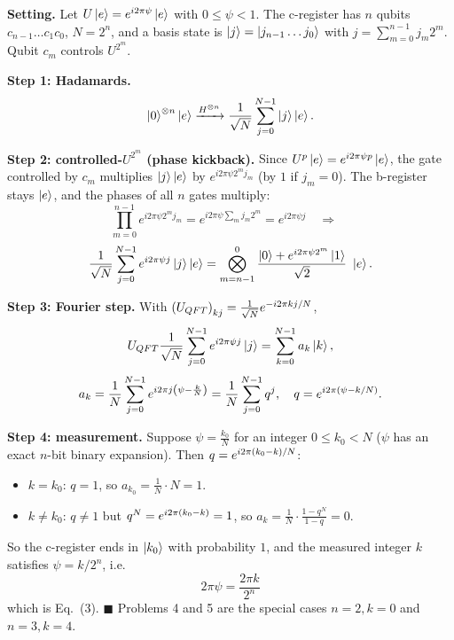 \documentclass[a4paper, 10pt]{article}
\begin{document}
\begin{solution}
	\noindent \textbf{Setting.} Let \( U\ket{e} = e^{i2\pi\psi}\ket{e} \) with \( 0 \le \psi < 1 \). The c-register has \( n \) qubits \( c_{n - 1}\dots c_1c_0 \), \( N = 2^n \), and a basis state is \( \ket{j} = \ket{j_{n - 1}\dots j_0} \) with \( j = \sum_{m = 0}^{n - 1}j_m2^m \). Qubit \( c_m \) controls \( U^{2^m} \).

	\myspace

	\noindent \textbf{Step 1: Hadamards.}
	\[
		\ket{0}^{\otimes n}\ket{e} \xrightarrow{H^{\otimes n}} \frac{1}{\sqrt{N}}\sum_{j = 0}^{N - 1}\ket{j}\ket{e}.
	\]

	\noindent \textbf{Step 2: controlled-\( U^{2^m} \) (phase kickback).} Since \( U^{p}\ket{e} = e^{i2\pi\psi p}\ket{e} \), the gate controlled by \( c_m \) multiplies \( \ket{j}\ket{e} \) by \( e^{i2\pi\psi 2^m j_m} \) (by \( 1 \) if \( j_m = 0 \)). The b-register stays \( \ket{e} \), and the phases of all \( n \) gates multiply:
	\[
		\prod_{m = 0}^{n - 1}e^{i2\pi\psi 2^m j_m} = e^{i2\pi\psi\sum_m j_m2^m} = e^{i2\pi\psi j}
		\quad\Rightarrow\quad
	\]
	\[
		\frac{1}{\sqrt{N}}\sum_{j = 0}^{N - 1}e^{i2\pi\psi j}\ket{j}\ket{e} = \bigotimes_{m = n - 1}^{0}\frac{\ket{0} + e^{i2\pi\psi 2^m}\ket{1}}{\sqrt{2}}\ \ket{e}.
	\]

	\noindent \textbf{Step 3: Fourier step.} With \( \left(U_{QFT}\right)_{kj} = \frac{1}{\sqrt{N}}e^{-i2\pi kj/N} \),
	\[
		U_{QFT}\frac{1}{\sqrt{N}}\sum_{j = 0}^{N - 1}e^{i2\pi\psi j}\ket{j} = \sum_{k = 0}^{N - 1}a_k\ket{k},
	\]
	\[
		a_k = \frac{1}{N}\sum_{j = 0}^{N - 1}e^{i2\pi j\left(\psi - \frac{k}{N}\right)} = \frac{1}{N}\sum_{j = 0}^{N - 1}q^{j}, \quad q = e^{i2\pi\left(\psi - k/N\right)}.
	\]

	\noindent \textbf{Step 4: measurement.} Suppose \( \psi = \frac{k_0}{N} \) for an integer \( 0 \le k_0 < N \) (\( \psi \) has an exact \( n \)-bit binary expansion). Then \( q = e^{i2\pi\left(k_0 - k\right)/N} \):
	\begin{itemize}
		\item \( k = k_0 \): \( q = 1 \), so \( a_{k_0} = \frac{1}{N} \cdot N = 1 \).
		\item \( k \neq k_0 \): \( q \neq 1 \) but \( q^N = e^{i2\pi\left(k_0 - k\right)} = 1 \), so \( a_k = \frac{1}{N}\cdot\frac{1 - q^N}{1 - q} = 0 \).
	\end{itemize}
	So the c-register ends in \( \ket{k_0} \) with probability \( 1 \), and the measured integer \( k \) satisfies \( \psi = k/2^n \), i.e.
	\[
		\boxed{\ 2\pi\psi = \frac{2\pi k}{2^n}\ }
	\]
	which is Eq.~(3). \( \blacksquare \)
	Problems 4 and 5 are the special cases \( n = 2, k = 0 \) and \( n = 3, k = 4 \).


\end{solution}
\end{document}
